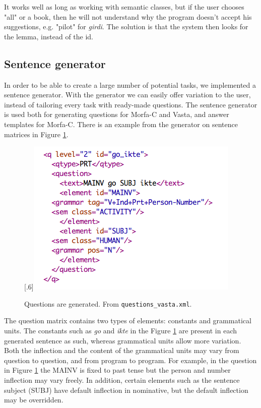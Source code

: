\documentclass[a4paper,12pt]{article}
\begin{document}
It works well as long as working with semantic classes, but if the user chooses "all" or a book, then he will not understand why the program doesn't accept his suggestions, e.g. "pilot" for \textit{girdi}. The solution is that the system then looks for the lemma, instead of the id.

\subsection{Sentence generator}\label{set}
In order to be able to create a large number of potential tasks, we implemented a sentence generator. With the generator we can easily offer variation to the user, instead of tailoring every task with ready-made questions. The sentence generator is used both for generating questions for Morfa-C and Vasta, and answer templates for Morfa-C. There is an example from the generator on sentence matrices in Figure \ref{questionv}.
\begin{figure}[htbp]
\begin{center}
\scalebox{.6}[.6]{\includegraphics{presentation/img/question_vasta.png}}\\
\caption{Questions are generated. From \texttt{questions\_vasta.xml}.}
\label{questionv}
\end{center}
\end{figure}

The question matrix contains two types of elements: constants and grammatical units. The constants such as \textit{go} and \textit{ikte} in the Figure \ref{questionv} are present in each generated sentence as such, whereas grammatical units allow more variation. Both the inflection and the content of the grammatical units may vary from question to question, and from program to program. For example, in the question in Figure \ref{questionv} the MAINV is fixed to past tense but the person and number inflection may vary freely. In addition, certain elements such as the sentence subject (SUBJ) have default inflection in nominative, but the default inflection may be overridden. 
\end{document}
